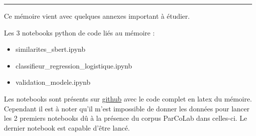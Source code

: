 \noindent\rule{\textwidth}{0.4pt}

Ce mémoire vient avec quelques annexes important à étudier. 

Les 3 notebooks python de code liés au mémoire{ :}
\begin{itemize}
    \item similarites\_sbert.ipynb
    \item classifieur\_regression\_logistique.ipynb
    \item validation\_modele.ipynb
\end{itemize}

Les notebooks sont présents sur \href{https://github.com/thibaultDumortier/memoire}{github} avec le code complet en latex du mémoire.
Cependant il est à noter qu'il m'est impossible de donner les données pour lancer les 2
premiers notebooks dû à la présence du corpus ParCoLab dans celles-ci. Le dernier notebook
est capable d'être lancé.